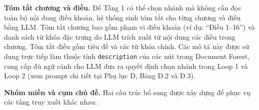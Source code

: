 \begin{table}[htbp]
  \centering
  \caption{Thống kê Knowledge Graph}
  \label{tab:kg-statistics}
\end{table}

\textbf{Tóm tắt chương và điều.}
Để Tầng 1 có thể chọn nhánh mà không cần đọc toàn bộ nội dung điều khoản, hệ
thống sinh tóm tắt cho từng chương và điều bằng LLM. Tóm tắt chương bao gồm phạm
vi điều khoản (ví dụ: ``Điều 1--16'') và danh sách từ khóa đặc trưng do LLM trích
xuất từ nội dung các điều trong chương. Tóm tắt điều gồm tiêu đề và các từ khóa
chính. Các mô tả này được sử dụng trực tiếp làm thuộc tính \texttt{description}
của các nút trong Document Forest, cung cấp đủ ngữ cảnh cho LLM đưa ra quyết định
chọn nhánh trong Loop 1 và Loop 2 (xem prompt chi tiết tại Phụ lục D, Bảng D.2
và D.3).

\textbf{Nhóm miền và cụm chủ đề.}
Hai cấu trúc bổ sung được xây dựng để phục vụ các tầng truy xuất khác nhau:

